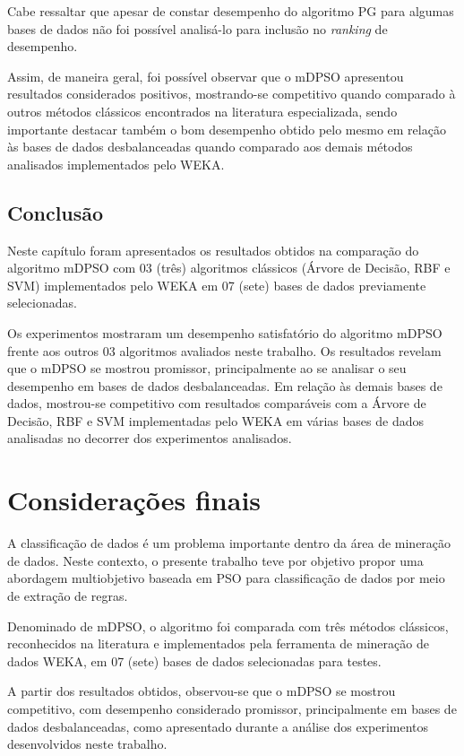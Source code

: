 \documentclass[
	12pt,				%
	openany,			%
	oneside,	
	a4paper,			%
	brazil,				%
	]{unimontes-ppgmsc-abntex2}
\begin{document}
Cabe ressaltar que apesar de constar desempenho do algoritmo PG para algumas bases de dados não foi possível analisá-lo para inclusão no {\em ranking} de desempenho. 

Assim, de maneira geral, foi possível observar que o mDPSO apresentou resultados considerados positivos, mostrando-se competitivo quando comparado à outros métodos clássicos encontrados na literatura especializada, sendo importante destacar também o bom desempenho obtido pelo mesmo em relação às bases de dados desbalanceadas quando comparado aos demais métodos analisados implementados pelo WEKA.

\section{Conclusão}

Neste capítulo foram apresentados os resultados obtidos na comparação do algoritmo mDPSO com 03 (três) algoritmos clássicos (Árvore de Decisão, RBF e SVM) implementados pelo WEKA em 07 (sete) bases de dados previamente selecionadas. 

Os experimentos mostraram um desempenho satisfatório do algoritmo mDPSO frente aos outros 03 algoritmos avaliados neste trabalho. Os resultados revelam que o mDPSO se mostrou promissor, principalmente ao se analisar o seu desempenho em bases de dados desbalanceadas. Em relação às demais bases de dados, mostrou-se competitivo com resultados comparáveis com a Árvore de Decisão, RBF e SVM implementadas pelo WEKA em várias bases de dados analisadas no decorrer dos experimentos analisados.

\chapter[Considerações Finais]{Considerações finais}
\label{ch:cons_finais}

A classificação de dados é um problema importante dentro da área de mineração de dados. Neste contexto, o presente trabalho teve por objetivo propor uma abordagem multiobjetivo baseada em PSO para classificação de dados por meio de extração de regras. 

Denominado de mDPSO, o algoritmo foi comparada com três métodos clássicos, reconhecidos na literatura e implementados pela ferramenta de mineração de dados WEKA, em 07 (sete) bases de dados selecionadas para testes. 

A partir dos resultados obtidos, observou-se que o mDPSO se mostrou competitivo, com desempenho considerado promissor, principalmente em bases de dados desbalanceadas, como apresentado durante a análise dos experimentos desenvolvidos neste trabalho.
\end{document}
